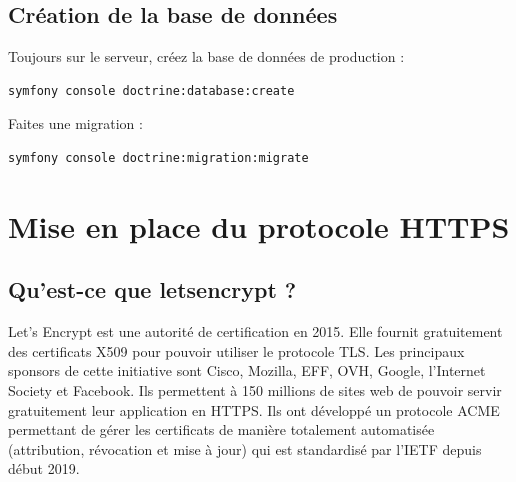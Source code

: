 \documentclass{article}
\begin{document}
\subsection{Création de la base de données}
Toujours sur le serveur, créez la base de données de production :
\begin{verbatim}
symfony console doctrine:database:create
\end{verbatim}

Faites une migration :
\begin{verbatim}
symfony console doctrine:migration:migrate
\end{verbatim}

\section{Mise en place du protocole HTTPS}
\subsection{Qu'est-ce que letsencrypt ?}
Let's Encrypt est une autorité de certification en 2015. Elle fournit gratuitement des certificats X509 pour pouvoir utiliser le protocole TLS. Les principaux sponsors de cette initiative sont Cisco, Mozilla, EFF, OVH, Google, l'Internet Society et Facebook. Ils permettent à 150 millions de sites web de pouvoir servir gratuitement leur application en HTTPS. Ils ont développé un protocole ACME permettant de gérer les certificats de manière totalement automatisée (attribution, révocation et mise à jour) qui est standardisé par l'IETF depuis début 2019.
\end{document}
